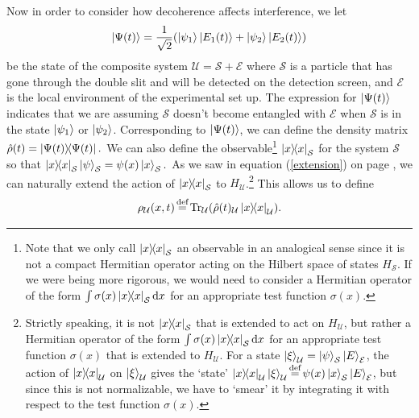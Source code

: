     Now in order to consider how decoherence affects interference, we let $$\ket{\Psi(t)}=\frac{1}{\sqrt{2}}(\ket{\psi_1}\ket{E_1(t)}+\ket{\psi_2}\ket{E_2(t)})$$ be the state of the composite system $\mathcal{U}=\mathcal{S}+\mathcal{E}$ where $\mathcal{S}$ is a particle that has gone through the double slit and will be detected on the detection screen, and $\mathcal{E}$ is the local environment of the experimental set up. The expression for $\ket{\Psi(t)}$ indicates that we are assuming  $\mathcal{S}$ doesn't become entangled with $\mathcal{E}$ when $\mathcal{S}$ is in the state $\ket{\psi_1}$ or $\ket{\psi_2}$. Corresponding to $\ket{\Psi(t)}$, we can define the density matrix  $\hat{\rho}(t)=\dyad{\Psi(t)}.$  We can also define the observable\footnote{Note that we only call $\dyad{x}_\mathcal{S}$ an observable in an analogical sense since it is not a compact Hermitian operator acting on the Hilbert space of states $H_\mathcal{S}$. If we were being more rigorous, we would need to consider a Hermitian operator of the form $\int \sigma(x)\dyad{x}_\mathcal{S}\dd x$ for an appropriate test function $\sigma(x)$. } $\dyad{x}_\mathcal{S}$ for the system $\mathcal{S}$ so that $\dyad{x}_\mathcal{S}\ket{\psi}_\mathcal{S}=\psi(x)\ket{x}_\mathcal{S}.$ As we saw in equation (\ref{extension}) on page \pageref{extension}, we can naturally extend the action of $\dyad{x}_\mathcal{S}$ to $H_\mathcal{U}$.\footnote{Strictly speaking, it is not $\dyad{x}_\mathcal{S}$ that is extended to act on $H_\mathcal{U}$, but rather a Hermitian operator of the form $\int \sigma(x)\dyad{x}_\mathcal{S}\dd x$ for an appropriate test function $\sigma(x)$ that is extended to $H_\mathcal{U}$. For a state $\ket{\xi}_\mathcal{U}=\ket{\psi}_\mathcal{S}\ket{E}_\mathcal{E}$, the action of $\dyad{x}_\mathcal{U}$ on $\ket{\xi}_\mathcal{U}$ gives the `state' $\dyad{x}_\mathcal{U}\ket{\xi}_\mathcal{U}\myeq\psi(x)\ket{x}_\mathcal{S}\ket{E}_\mathcal{E}$, but since this is not normalizable, we have to `smear' it by integrating it with respect to the test function $\sigma(x)$.}  
    This allows us to define 
    $$\rho_\mathcal{U}(x, t)\myeq\Tr_\mathcal{U}(\hat{\rho}(t)_\mathcal{U}\dyad{x}_\mathcal{U}).$$
